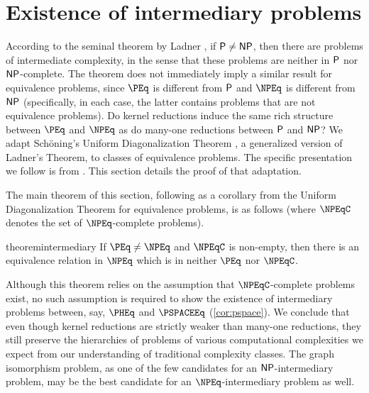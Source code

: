 \section{Existence of intermediary problems}
\label{sec:intermediary}
%
According to the seminal theorem by Ladner \autocite{ladner}, if $\P \neq \NP$, then there are problems of intermediate complexity, in the sense that these problems are neither in $\P$ nor $\NP$-complete.
The theorem does not immediately imply a similar result for equivalence problems, since $\PEq$ is different from $\P$ and $\NPEq$ is different from $\NP$ (specifically, in each case, the latter contains problems that are not equivalence problems).
Do kernel reductions induce the same rich structure between $\PEq$ and $\NPEq$ as do many-one reductions between $\P$ and $\NP$?
We adapt Schöning's Uniform Diagonalization Theorem \autocite{schoning}, a generalized version of Ladner's Theorem, to classes of equivalence problems.
The specific presentation we follow is from \autocite{bdg95}.
This section details the proof of that adaptation.

%
The main theorem of this section, following as a corollary from the Uniform Diagonalization Theorem for equivalence problems, is as follows (where $\NPEqC$ denotes the set of $\NPEq$-complete problems).
\begin{restatable*}{theorem}{intermediary}\label{thm:intermediary}
  If $\PEq \neq \NPEq$ and $\NPEqC$ is non-empty, then there is an equivalence relation in $\NPEq$ which is in neither $\PEq$ nor $\NPEqC$.
\end{restatable*}
Although this theorem relies on the assumption that $\NPEqC$-complete problems exist, no such assumption is required to show the existence of intermediary problems between, say, $\PHEq$ and $\PSPACEEq$ (\autoref{cor:pspace}).
We conclude that even though kernel reductions are strictly weaker than many-one reductions, they still preserve the hierarchies of problems of various computational complexities we expect from our understanding of traditional complexity classes.
The graph isomorphism problem, as one of the few candidates for an $\NP$-intermediary problem, may be the best candidate for an $\NPEq$-intermediary problem as well.


